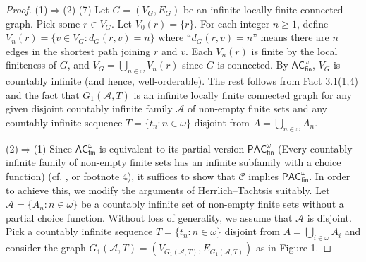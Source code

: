 \documentclass[12pt,reqno,a4paper]{amsart}
\theoremstyle{definition}
\begin{document}
	\begin{proof}
		(1)$\Rightarrow$(2)-(7) 
		Let $G=(V_{G}, E_{G})$ be an infinite locally finite connected graph.
		Pick some $r \in V_{G}$. Let $V_{0}(r)=\{r\}$. For each integer $n \geq 1$, define $V_{n}(r) = \{v \in V_{G} : d_{G}(r, v) = n\}$ where ``$d_{G}(r, v) = n$'' means there are $n$ edges in the shortest path joining
		$r$ and $v$. Each $V_{n}(r)$ is finite by the local
		finiteness of $G$, and $V_{G} = \bigcup_{n\in \omega}V_{n}(r)$ since $G$ is connected. 
		By $\mathsf{AC^{\omega}_{fin}}$, $V_{G}$ is countably infinite (and hence, well-orderable). The rest follows from Fact 3.1(1,4) and the fact that  
		$G_{1}(\mathcal{A},T)$ is
		an infinite locally finite connected graph for any given disjoint countably infinite family $\mathcal{A}$ of non-empty finite sets and any countably infinite sequence $T=\{t_{n}:n\in \omega\}$ disjoint from $A=\bigcup_{n\in\omega}A_{n}$.
		
		(2)$\Rightarrow$(1) 
		Since $\mathsf{AC_{fin}^{\omega}}$ is equivalent to its partial version $\mathsf{PAC_{fin}^{\omega}}$ (Every countably infinite family of non-empty finite sets has an infinite
		subfamily with a choice function) (cf. \cite{HR1998}, \cite[the proof of Theorem 4.1(i)]{DHHKR2008} or footnote 4), it suffices to show that $\mathcal{C}$  implies $\mathsf{PAC_{fin}^{\omega}}$.
		In order to achieve this, we modify the arguments of Herrlich--Tachtsis \cite[Proposition 23]{HT2006} suitably.
		Let $\mathcal{A}=\{A_{n}:n\in \omega\}$ be a countably infinite set of non-empty finite sets without a partial choice function. Without loss of generality, we assume that $\mathcal{A}$ is disjoint. Pick a countably infinite sequence $T=\{t_{n}:n\in \omega\}$ disjoint from $A=\bigcup_{i\in\omega}A_{i}$ and consider the graph $G_{1}(\mathcal{A},T)=(V_{G_{1}(\mathcal{A},T)}, E_{G_{1}(\mathcal{A},T)})$ as in Figure 1.
		

\end{proof}
\end{document}

